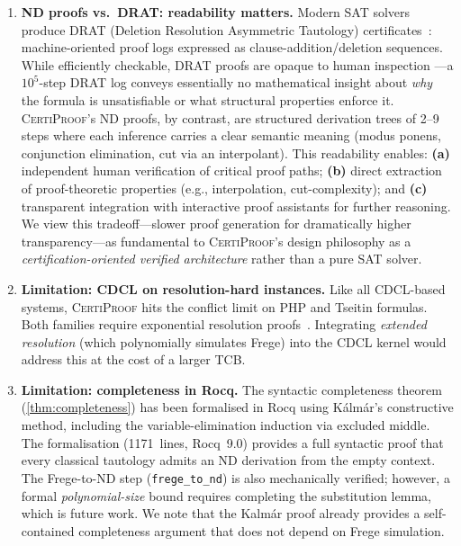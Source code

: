 \documentclass[acmtocl,review,anonymous]{acmart}
\newcommand{\CP}{\textsc{CertiProof}}
\begin{document}
\begin{enumerate}
  \item \textbf{ND proofs vs.~DRAT: readability matters.}
    Modern SAT solvers produce DRAT (Deletion Resolution Asymmetric
    Tautology) certificates~\cite{HeuleHuntMahmoud2017}: machine-oriented
    proof logs expressed as clause-addition/deletion sequences.  While
    efficiently checkable, DRAT proofs are opaque to human inspection
    ---a $10^5$-step DRAT log conveys essentially no mathematical
    insight about \emph{why} the formula is unsatisfiable or what
    structural properties enforce it.  \CP{}'s ND proofs, by contrast,
    are structured derivation trees of 2--9 steps where each inference
    carries a clear semantic meaning (modus ponens, conjunction
    elimination, cut via an interpolant).  This readability enables:
    \textbf{(a)} independent human verification of critical proof paths;
    \textbf{(b)} direct extraction of proof-theoretic properties (e.g.,
    interpolation, cut-complexity); and \textbf{(c)} transparent
    integration with interactive proof assistants for further reasoning.
    We view this tradeoff---slower proof generation for dramatically
    higher transparency---as fundamental to \CP{}'s design philosophy
    as a \emph{certification-oriented verified architecture} rather than a pure SAT solver.

  \item \textbf{Limitation: CDCL on resolution-hard instances.}
    Like all CDCL-based systems, \CP{} hits the conflict limit on
    PHP and Tseitin formulas.  Both families require exponential
    resolution proofs~\cite{BenSasson2002}.  Integrating \emph{extended
    resolution} (which polynomially simulates Frege) into the CDCL
    kernel would address this at the cost of a larger TCB.

  \item \textbf{Limitation: completeness in Rocq.}
    The syntactic completeness theorem (\cref{thm:completeness}) has
    been formalised in Rocq using K\'{a}lm\'{a}r's constructive
    method, including the variable-elimination induction via excluded
    middle.  The formalisation (1171~lines, Rocq~9.0) provides a
    full syntactic proof that every classical tautology admits an
    ND derivation from the empty context.  The Frege-to-ND step
    (\texttt{frege\_to\_nd}) is also mechanically verified; however, a
    formal \emph{polynomial-size} bound requires completing the
    substitution lemma, which is future work.  We note that the
    Kalm\'{a}r proof already provides a self-contained completeness
    argument that does not depend on Frege simulation.
\end{enumerate}
\end{document}
